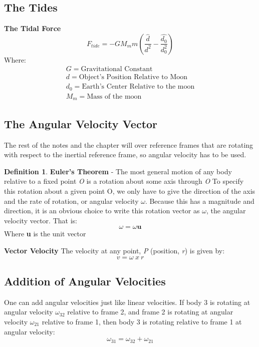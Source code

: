\documentclass[11pt]{article}
\theoremstyle{definition}
\newtheorem{defn}{Definition}
\begin{document}
\subsection{The Tides}
\begin{shaded}
\textbf{The Tidal Force} \newline
\begin{equation}
F_{tide} = -GM_mm(\frac{\hat{d}}{d^2}-\frac{\hat{d_0}}{d_0^2})
\end{equation}
Where:
\begin{equation*}
\begin{split}
G = \text{Gravitational Constant} \\
d = \text{Object's Position Relative to Moon} \\
d_0 = \text{Earth's Center Relative to the moon}\\
M_m = \text{Mass of the moon}
\end{split}
\end{equation*}
\end{shaded}
\newpage
\subsection{The Angular Velocity Vector}
The rest of the notes and the chapter will over reference frames that are rotating with respect to the inertial reference frame, so angular velocity has to be used. 
\begin{defn}
\textbf{Euler's Theorem} - The most general motion of any body relative to a fixed point \textit{O} is a rotation about some axis through \textit{O} To specify this rotation about a given point O, we only have to give the direction of the axis and the rate of rotation, or angular velocity $\omega$. Because this has a magnitude and direction, it is an obvious choice to write this rotation vector as $\omega$, the angular velocity vector. That is:
\begin{equation}
\omega = \omega\textbf{u}
\end{equation}
Where \textbf{u} is the unit vector
\end{defn}
\begin{shaded}
\textbf{Vector Velocity}\newline
The velocity at any point, \textit{P} (position, \textit{r}) is given by:
\begin{equation}
v = \omega\  x \ r
\end{equation}
\end{shaded}
\subsection*{Addition of Angular Velocities}
One can add angular velocities just like linear velocities. If body 3 is rotating at angular velocity $\omega_{32}$ relative to frame 2, and frame 2 is rotating at angular velocity $\omega_{21}$ relative to frame 1, then body 3 is rotating relative to frame 1 at angular velocity: 
\begin{equation}
\omega_{31} = \omega_{32} + \omega_{21}
\end{equation}
\end{document}

